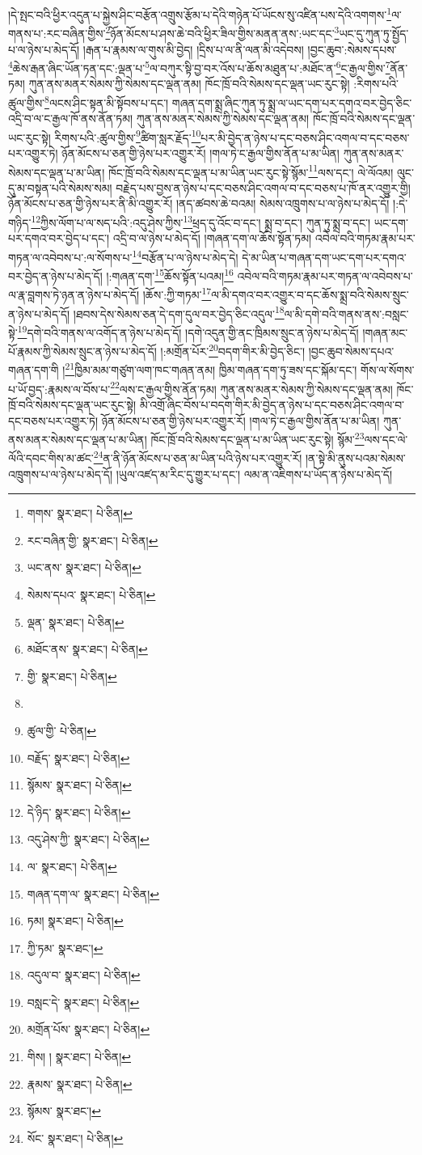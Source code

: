 །དེ་སྤང་བའི་ཕྱིར་འདུན་པ་སྐྱེས་ཤིང་བརྩོན་འགྲུས་རྩོམ་པ་དེའི་གཉེན་པོ་ཡོངས་སུ་འཛིན་པས་དེའི་འགགས་\footnote{གགས་  སྣར་ཐང་།  པེ་ཅིན། }ལ་གནས་པ་:རང་བཞིན་གྱིས་\footnote{རང་བཞིན་གྱི་  སྣར་ཐང་།  པེ་ཅིན། }ཉོན་མོངས་པ་ཤས་ཆེ་བའི་ཕྱིར་ཟིལ་གྱིས་མནན་ནས་:ཡང་དང་\footnote{ཡང་ནས་  སྣར་ཐང་།  པེ་ཅིན། }ཡང་དུ་ཀུན་ཏུ་སྤྱོད་པ་ལ་ཉེས་པ་མེད་དོ། །རྒན་པ་རྣམས་ལ་གུས་མི་བྱེད། །དྲིས་པ་ལ་ནི་ལན་མི་འདེབས། །བྱང་ཆུབ་:སེམས་དཔས་\footnote{སེམས་དཔའ་  སྣར་ཐང་།  པེ་ཅིན། }ཆེས་རྒན་ཞིང་ཡོན་ཏན་དང་:ལྡན་པ་\footnote{ལྡན་  སྣར་ཐང་།  པེ་ཅིན། }ལ་བཀུར་སྟི་བྱ་བར་འོས་པ་ཆོས་མཐུན་པ་:མཐོང་ན་\footnote{མཐོང་ནས་  སྣར་ཐང་།  པེ་ཅིན། }ང་རྒྱལ་གྱིས་\footnote{གྱི་  སྣར་ཐང་།  པེ་ཅིན། }ནོན་ཏམ། ཀུན་ནས་མནར་སེམས་ཀྱི་སེམས་དང་ལྡན་ནམ། ཁོང་ཁྲོ་བའི་སེམས་དང་ལྡན་ཡང་རུང་སྟེ། :རིགས་པའི་ཚུལ་གྱིས་\footnote{}ལངས་ཤིང་སྟན་མི་སྟོབས་པ་དང་། གཞན་དག་སྨྲ་ཞིང་ཀུན་ཏུ་སྨྲ་ལ་ཡང་དག་པར་དགའ་བར་བྱེད་ཅིང་འདྲི་བ་ལ་ང་རྒྱལ་ཁོ་ནས་ནོན་ཏམ། ཀུན་ནས་མནར་སེམས་ཀྱི་སེམས་དང་ལྡན་ནམ། ཁོང་ཁྲོ་བའི་སེམས་དང་ལྡན་ཡང་རུང་སྟེ། རིགས་པའི་:ཚུལ་གྱིས་\footnote{ཚུལ་གྱི་  པེ་ཅིན། }ཚིག་སླར་རྗོད་\footnote{བརྗོད་  སྣར་ཐང་།  པེ་ཅིན། }པར་མི་བྱེད་ན་ཉེས་པ་དང་བཅས་ཤིང་འགལ་བ་དང་བཅས་པར་འགྱུར་ཏེ། ཉོན་མོངས་པ་ཅན་གྱི་ཉེས་པར་འགྱུར་རོ། །གལ་ཏེ་ང་རྒྱལ་གྱིས་ནོན་པ་མ་ཡིན། ཀུན་ནས་མནར་སེམས་དང་ལྡན་པ་མ་ཡིན། ཁོང་ཁྲོ་བའི་སེམས་དང་ལྡན་པ་མ་ཡིན་ཡང་རུང་སྟེ་སྙོམ་\footnote{སྙོམས་  སྣར་ཐང་།  པེ་ཅིན། }ལས་དང་། ལེ་ལོའམ། ལུང་དུ་མ་བསྟན་པའི་སེམས་སམ། བརྗེད་པས་བྱས་ན་ཉེས་པ་དང་བཅས་ཤིང་འགལ་བ་དང་བཅས་པ་ཁོ་ནར་འགྱུར་གྱི། ཉོན་མོངས་པ་ཅན་གྱི་ཉེས་པར་ནི་མི་འགྱུར་རོ། །ནད་ཚབས་ཆེ་བའམ། སེམས་འཁྲུགས་པ་ལ་ཉེས་པ་མེད་དོ། །:དེ་གཉིད་\footnote{དེ་ཉིད་  སྣར་ཐང་།  པེ་ཅིན། }ཀྱིས་ལོག་པ་ལ་སད་པའི་:འདུ་ཤེས་ཀྱིས་\footnote{འདུ་ཤེས་ཀྱི་  སྣར་ཐང་།  པེ་ཅིན། }ཕྲད་དུ་འོང་བ་དང་། སྨྲ་བ་དང་། ཀུན་ཏུ་སྨྲ་བ་དང་། ཡང་དག་པར་དགའ་བར་བྱེད་པ་དང་། འདྲི་བ་ལ་ཉེས་པ་མེད་དོ། །གཞན་དག་ལ་ཆོས་སྟོན་ཏམ། འབེལ་བའི་གཏམ་རྣམ་པར་གཏན་ལ་འབེབས་པ་:ལ་སོགས་པ་\footnote{ལ་  སྣར་ཐང་།  པེ་ཅིན། }བརྩོན་པ་ལ་ཉེས་པ་མེད་དེ། དེ་མ་ཡིན་པ་གཞན་དག་ཡང་དག་པར་དགའ་བར་བྱེད་ན་ཉེས་པ་མེད་དོ། །:གཞན་དག་\footnote{གཞན་དག་ལ་  སྣར་ཐང་།  པེ་ཅིན། }ཆོས་སྟོན་པའམ།\footnote{ཏམ།  སྣར་ཐང་།  པེ་ཅིན། } འབེལ་བའི་གཏམ་རྣམ་པར་གཏན་ལ་འབེབས་པ་ལ་རྣ་བླགས་ཏེ་ཉན་ན་ཉེས་པ་མེད་དོ། །ཆོས་:ཀྱི་གཏམ་\footnote{ཀྱི་ཏམ་  སྣར་ཐང་། }ལ་མི་དགའ་བར་འགྱུར་བ་དང་ཆོས་སྨྲ་བའི་སེམས་སྲུང་ན་ཉེས་པ་མེད་དོ། །ཐབས་དེས་སེམས་ཅན་དེ་དག་དུལ་བར་བྱེད་ཅིང་འདུལ་\footnote{འདུལ་བ་  སྣར་ཐང་།  པེ་ཅིན། }ལ་མི་དགེ་བའི་གནས་ནས་:བསླང་སྟེ་\footnote{བསླང་དེ་  སྣར་ཐང་།  པེ་ཅིན། }དགེ་བའི་གནས་ལ་འགོད་ན་ཉེས་པ་མེད་དོ། །དགེ་འདུན་གྱི་ནང་ཁྲིམས་སྲུང་ན་ཉེས་པ་མེད་དོ། །གཞན་མང་པོ་རྣམས་ཀྱི་སེམས་སྲུང་ན་ཉེས་པ་མེད་དོ། །:མགྲོན་པོར་\footnote{མགྲོན་པོས་  སྣར་ཐང་།  པེ་ཅིན། }བདག་གིར་མི་བྱེད་ཅིང་། །བྱང་ཆུབ་སེམས་དཔའ་གཞན་དག་གི །\footnote{གིས། །  སྣར་ཐང་།  པེ་ཅིན། }ཁྱིམ་མམ་གཙུག་ལག་ཁང་གཞན་ནམ། ཁྱིམ་གཞན་དག་ཏུ་ཟས་དང་སྐོམ་དང་། གོས་ལ་སོགས་པ་ཡོ་བྱད་:རྣམས་ལ་བོས་པ་\footnote{རྣམས་  སྣར་ཐང་།  པེ་ཅིན། }ལས་ང་རྒྱལ་གྱིས་ནོན་ཏམ། ཀུན་ནས་མནར་སེམས་ཀྱི་སེམས་དང་ལྡན་ནམ། ཁོང་ཁྲོ་བའི་སེམས་དང་ལྡན་ཡང་རུང་སྟེ། མི་འགྲོ་ཞིང་བོས་པ་བདག་གིར་མི་བྱེད་ན་ཉེས་པ་དང་བཅས་ཤིང་འགལ་བ་དང་བཅས་པར་འགྱུར་ཏེ། ཉོན་མོངས་པ་ཅན་གྱི་ཉེས་པར་འགྱུར་རོ། །གལ་ཏེ་ང་རྒྱལ་གྱིས་ནོན་པ་མ་ཡིན། ཀུན་ནས་མནར་སེམས་དང་ལྡན་པ་མ་ཡིན། ཁོང་ཁྲོ་བའི་སེམས་དང་ལྡན་པ་མ་ཡིན་ཡང་རུང་སྟེ། སྙོམ་\footnote{སྙོམས་  སྣར་ཐང་། }ལས་དང་ལེ་ལོའི་དབང་གིས་མ་ཚང་\footnote{སོང་  སྣར་ཐང་།  པེ་ཅིན། }ན་ནི་ཉོན་མོངས་པ་ཅན་མ་ཡིན་པའི་ཉེས་པར་འགྱུར་རོ། །ན་སྟེ་མི་ནུས་པའམ་སེམས་འཁྲུགས་པ་ལ་ཉེས་པ་མེད་དོ། །ཡུལ་འཛད་མ་རིང་དུ་གྱུར་པ་དང་། ལམ་ན་འཇིགས་པ་ཡོད་ན་ཉེས་པ་མེད་དོ། 